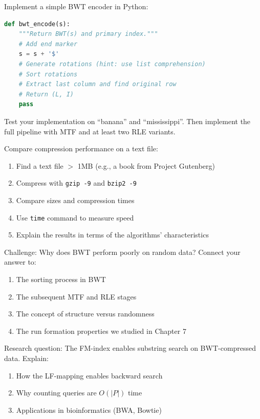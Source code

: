 \begin{exercisebox}
Implement a simple BWT encoder in Python:
\begin{lstlisting}[language=Python]
def bwt_encode(s):
    """Return BWT(s) and primary index."""
    # Add end marker
    s = s + '$'
    # Generate rotations (hint: use list comprehension)
    # Sort rotations
    # Extract last column and find original row
    # Return (L, I)
    pass
\end{lstlisting}
Test your implementation on ``banana'' and ``mississippi''.
Then implement the full pipeline with MTF and at least two RLE variants.
\end{exercisebox}

\begin{exercisebox}
Compare compression performance on a text file:
\begin{enumerate}
    \item Find a text file $>$ 1MB (e.g., a book from Project Gutenberg)
    \item Compress with \texttt{gzip -9} and \texttt{bzip2 -9}
    \item Compare sizes and compression times
    \item Use \texttt{time} command to measure speed
    \item Explain the results in terms of the algorithms' characteristics
\end{enumerate}
\end{exercisebox}

\begin{exercisebox}
Challenge: Why does BWT perform poorly on random data? Connect your answer to:
\begin{enumerate}
    \item The sorting process in BWT
    \item The subsequent MTF and RLE stages
    \item The concept of structure versus randomness
    \item The run formation properties we studied in Chapter 7
\end{enumerate}
\end{exercisebox}

\begin{exercisebox}
Research question: The FM-index enables substring search on BWT-compressed data. Explain:
\begin{enumerate}
    \item How the LF-mapping enables backward search
    \item Why counting queries are \(O(|P|)\) time
    \item Applications in bioinformatics (BWA, Bowtie)
\end{enumerate}
\end{exercisebox}

